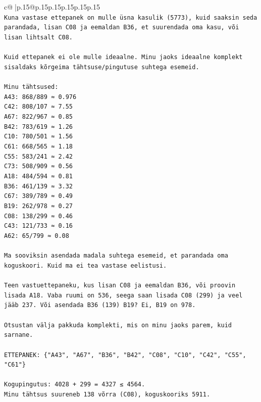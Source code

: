 \documentclass{article}
\begin{document}
{\begin{supertabular}{c@{$\;$}|p{.15\linewidth}@{}p{.15\linewidth}p{.15\linewidth}p{.15\linewidth}p{.15\linewidth}p{.15\linewidth}}
{{{\\ 
\texttt{Kuna vastase ettepanek on mulle üsna kasulik (5773), kuid saaksin seda parandada, lisan C08 ja eemaldan B36, et suurendada oma kasu, või lisan lihtsalt C08.} \\
\\ 
\texttt{Kuid ettepanek ei ole mulle ideaalne. Minu jaoks ideaalne komplekt sisaldaks kõrgeima tähtsuse/pingutuse suhtega esemeid.} \\
\\ 
\texttt{Minu tähtsused:} \\
\texttt{A43: 868/889 ≈ 0.976} \\
\texttt{C42: 808/107 ≈ 7.55} \\
\texttt{A67: 822/967 ≈ 0.85} \\
\texttt{B42: 783/619 ≈ 1.26} \\
\texttt{C10: 780/501 ≈ 1.56} \\
\texttt{C61: 668/565 ≈ 1.18} \\
\texttt{C55: 583/241 ≈ 2.42} \\
\texttt{C73: 508/909 ≈ 0.56} \\
\texttt{A18: 484/594 ≈ 0.81} \\
\texttt{B36: 461/139 ≈ 3.32} \\
\texttt{C67: 389/789 ≈ 0.49} \\
\texttt{B19: 262/978 ≈ 0.27} \\
\texttt{C08: 138/299 ≈ 0.46} \\
\texttt{C43: 121/733 ≈ 0.16} \\
\texttt{A62: 65/799 ≈ 0.08} \\
\\ 
\texttt{Ma sooviksin asendada madala suhtega esemeid, et parandada oma koguskoori. Kuid ma ei tea vastase eelistusi.} \\
\\ 
\texttt{Teen vastuettepaneku, kus lisan C08 ja eemaldan B36, või proovin lisada A18. Vaba ruumi on 536, seega saan lisada C08 (299) ja veel jääb 237. Või asendada B36 (139) B19? Ei, B19 on 978.} \\
\\ 
\texttt{Otsustan välja pakkuda komplekti, mis on minu jaoks parem, kuid sarnane.} \\
\\ 
\texttt{ETTEPANEK: \{"A43", "A67", "B36", "B42", "C08", "C10", "C42", "C55", "C61"\}} \\
\\ 
\texttt{Kogupingutus: 4028 + 299 = 4327 ≤ 4564.} \\
\texttt{Minu tähtsus suureneb 138 võrra (C08), koguskooriks 5911.} \\
            }
        }
    }
     \\ \\


\end{supertabular}}
\end{document}

